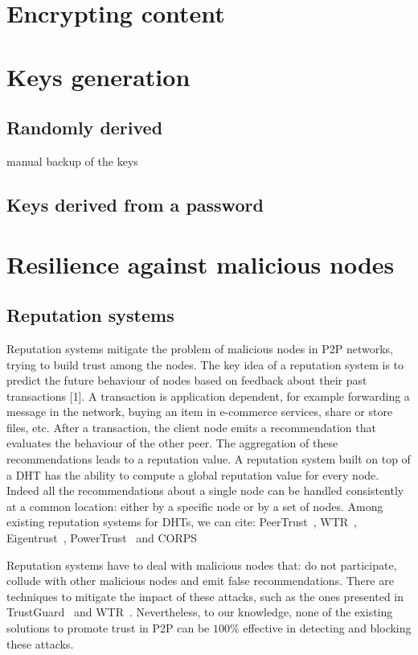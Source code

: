 


\section{Encrypting content}

\section{Keys generation}
\subsection{Randomly derived}
  manual backup of the keys
\subsection{Keys derived from a password}

\section{Resilience against malicious nodes}

 \subsection{Reputation systems}
Reputation systems mitigate the problem of malicious nodes in
P2P networks, trying to build trust among the nodes. The key
idea of a reputation system is to predict the future behaviour
of nodes based on feedback about their past transactions [1]. A
transaction is application dependent, for example forwarding a
message in the network, buying an item in e-commerce services,
share or store files, etc. After a transaction, the client node emits
a recommendation that evaluates the behaviour of the other peer.
The aggregation of these recommendations leads to a reputation
value.
A reputation system built on top of a DHT has the ability
to compute a global reputation value for every node. Indeed
all the recommendations about a single node can be handled
consistently at a common location: either by a specific node
or by a set of nodes. Among existing reputation systems for
DHTs, we can cite: PeerTrust~\cite{peertrust}, WTR~\cite{wtr},
Eigentrust~\cite{eigentrust},
PowerTrust~\cite{powertrust} and CORPS~\cite{corps}

Reputation systems have to deal with malicious nodes that:
do not participate, collude with other malicious nodes and
emit false recommendations. There are techniques to mitigate
the impact of these attacks, such as the ones presented in
TrustGuard~\cite{trustguard} and WTR~\cite{wtr}. Nevertheless, to our knowledge,
none of the existing solutions to promote trust in P2P can be
$100\%$ effective in detecting and blocking these attacks.

